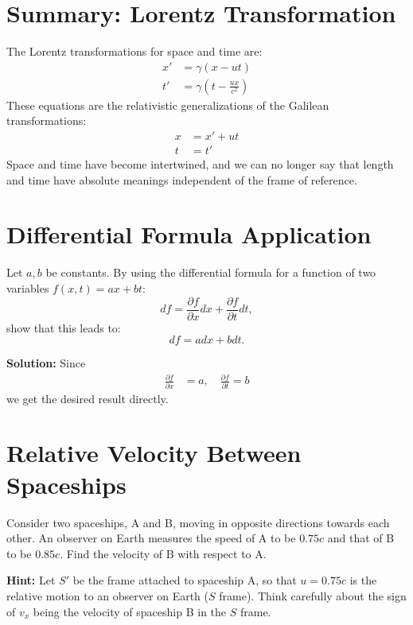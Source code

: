 \documentclass[a4paper,12pt]{article}
\begin{document}
\begin{multicols}{2}
\section*{Summary: Lorentz Transformation}
The Lorentz transformations for space and time are:
\begin{align*}
  x' &= \gamma (x - ut) \\
  t' &= \gamma \left( t - \frac{ux}{c^2} \right)
\end{align*}
These equations are the relativistic generalizations of the Galilean transformations:
\begin{align*}
  x &= x' + ut \\
  t &= t'
\end{align*}
Space and time have become intertwined, and we can no longer say that length and time have absolute meanings independent of the frame of reference.

\section*{Differential Formula Application}
Let $a, b$ be constants. By using the differential formula for a function of two variables $f(x, t) = ax + bt$:
\begin{equation}
  df = \frac{\partial f}{\partial x} dx + \frac{\partial f}{\partial t} dt,
\end{equation}
show that this leads to:
\begin{equation}
  df = a dx + b dt.
\end{equation}

\textbf{Solution:} Since
\begin{align*}
  \frac{\partial f}{\partial x} &= a, \quad \frac{\partial f}{\partial t} = b
\end{align*}
we get the desired result directly.

\section*{Relative Velocity Between Spaceships}
Consider two spaceships, A and B, moving in opposite directions towards each other. An observer on Earth measures the speed of A to be $0.75c$ and that of B to be $0.85c$. Find the velocity of B with respect to A.

\textbf{Hint:} Let $S'$ be the frame attached to spaceship A, so that $u = 0.75c$ is the relative motion to an observer on Earth ($S$ frame). Think carefully about the sign of $v_x$ being the velocity of spaceship B in the $S$ frame.


\end{multicols}
\end{document}
